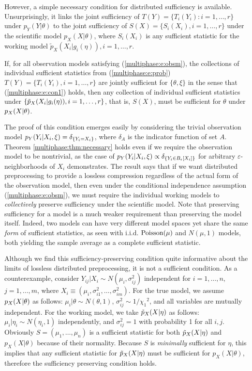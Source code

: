 However, a simple necessary condition for distributed sufficiency is available.
 Unsurprisingly, it links the joint sufficiency of $T(Y)=\{T_i(Y_i): i=1,\ldots, r\}$ under $p_{Y}(Y|\theta)$ to the joint sufficiency of $S(X)=\{S_i(X_i), i=1,\ldots,r\}$ under the scientific model $p_X(X|\theta)$, where $S_i(X_i)$ is any sufficient statistic for the working model $\tilde p_X(X_{i}|g_i(\eta)), i=1,\ldots, r$.
%
\begin{theorem}
\label{multiphase:thm:necessary}
If, for all observation models satisfying (\ref{multiphase:e:obsm}), the collections of individual sufficient statistics from (\ref{multiphase:e:prob}) $T(Y)=\{T_i(Y_i), i=1,\ldots, r\}$ are jointly sufficient for $\{\theta,\xi\}$ in the sense that  (\ref{multiphase:e:con1}) holds, then any collection of individual sufficient statistics under $\{\tilde{p}_X(X_i | g_i(\eta)), i=1,\ldots, r\}$, that is, $S(X)$, must be sufficient for $\theta$ under $p_X(X | \theta)$.
\end{theorem}
%
The proof of this condition emerges easily by considering the trivial observation model $p_Y(Y_i | X_i, \xi) = \delta_{\{Y_i = X_i\}}$, where $\delta_{A}$ is the indicator function of set $A$.
Theorem \ref{multiphase:thm:necessary} holds even if we require the observation model to be nontrivial, as the case of $p_Y(Y_i | X_i, \xi) \propto \delta_{\{Y_i \in B_{\epsilon}[X_i]\}}$ for arbitrary $\varepsilon$-neighborhoods of $X_i$ demonstrates.
The result says that if we want distributed preprocessing to provide a lossless compression regardless of the actual form of the observation model, then even under the conditional independence assumption (\ref{multiphase:e:obsm}), we must require the individual working models to  \textit{collectively} preserve sufficiency under the scientific model.
 Note that preserving sufficiency for a model is a much weaker requirement than preserving the model itself.
Indeed, two models can have very different model spaces yet share the same \textit{form} of sufficient statistics, as seen with i.i.d.
$\operatorname{Poisson}(\mu)$ and $N(\mu, 1)$ models, both yielding the sample average as a complete sufficient statistic.

Although we find this sufficiency-preserving condition quite informative about the limits of lossless distributed preprocessing, it is not a sufficient condition.
As a counterexample, consider  $Y_{ij} | X_i \sim N(\mu_i, \sigma_{ij}^2 )$ independent for $i=1,\ldots,n$, $j=1,\ldots,m$, where $X_i \equiv (\mu_i, \sigma_{i1}^2, \ldots, \sigma_{im}^2)$.
For the true model, we assume $p_X(X|\theta)$ as
follows: $\mu_i | \theta \sim N(\theta, 1)$, $\sigma_{ij}^2 \sim 1/{\chi_1}^2$, and all variables are mutually  independent.
For the working model, we take $\tilde{p}_X(X|\eta)$ as
follows: $\mu_i | \eta_i \sim N(\eta_i, 1)$ independently, and $\sigma_{ij}^2 = 1$ with probability 1 for all $i,j$.
%
Obviously $S=(\mu_1, \ldots, \mu_n)$ is a sufficient statistic for both $\tilde{p}_X(X|\eta)$ and $p_X(X|\theta)$ because of their normality. Because $S$ is \textit{minimally} sufficient for $\eta$, this implies that any sufficient statistic for $\tilde{p}_X(X|\eta)$ must be sufficient for $p_X(X|\theta)$, therefore the sufficiency preserving condition holds.


